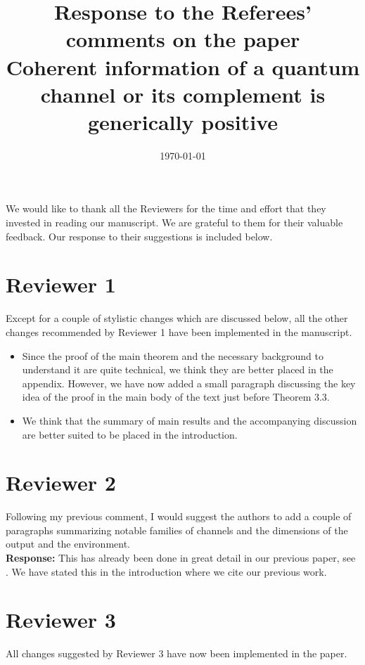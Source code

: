 \documentclass{article}
\title{Response to the Referees' comments on the paper\\ Coherent information of a quantum channel or its complement is generically positive}
\date{\small\today}
\begin{document}
\maketitle

We would like to thank all the Reviewers for the time and effort that they invested in reading our manuscript. We are grateful to them for their valuable feedback. Our response to their suggestions is included below.


\section{Reviewer 1}

Except for a couple of stylistic changes which are discussed below, all the other changes recommended by Reviewer 1 have been implemented in the manuscript.
\begin{itemize}
    \item Since the proof of the main theorem and the necessary background to understand it are quite technical, we think they are better placed in the appendix. However, we have now added a small paragraph discussing the key idea of the proof in the main body of the text just before Theorem 3.3.
    \item We think that the summary of main results and the accompanying discussion are better suited to be placed in the introduction.
\end{itemize}

\section{Reviewer 2}

 Following my previous comment, I would suggest the authors to add a couple of paragraphs summarizing notable families of channels and the dimensions of the output and the environment. \\

\textbf{Response:} This has already been done in great detail in our previous paper, see \cite{Singh2022detecting}. We have stated this in the introduction where we cite our previous work. \\

\section{Reviewer 3}

All changes suggested by Reviewer 3 have now been implemented in the paper.




\end{document}
